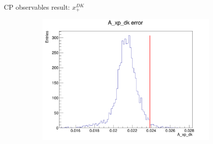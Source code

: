 \documentclass{beamer}
\begin{document}
\begin{frame}{CP observables result: $x_+^{DK}$}
\begin{figure}
\begin{subfigure}{0.42\textwidth}
      \includegraphics[width = 1.0\textwidth]{Plots/A_xp_dk_error_WithDataUncertainty.png}
    \end{subfigure}
  \end{figure}
\end{frame}
\end{document}
